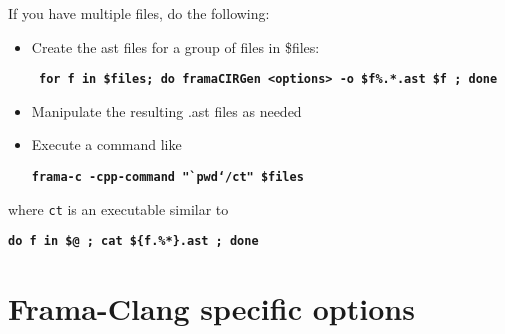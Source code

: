 If you have multiple files, do the following:
\begin{itemize}
\item Create the ast files for a group of files in \$files:\\
\centerline{\bf \texttt{ for f in \$files; do framaCIRGen <options> -o \${f\%.*}.ast \$f ; done }}
\item Manipulate the resulting .ast files as needed
\item Execute a command like \\
\centerline{\bf \texttt{frama-c -cpp-command "`pwd`/ct" \$files}}
\end{itemize}
where \lstinline|ct| is an executable similar to\\
\centerline{\bf \texttt{do f in \$@ ; cat \$\{f.\%*\}.ast ; done}}

\section{Frama-Clang specific options}

